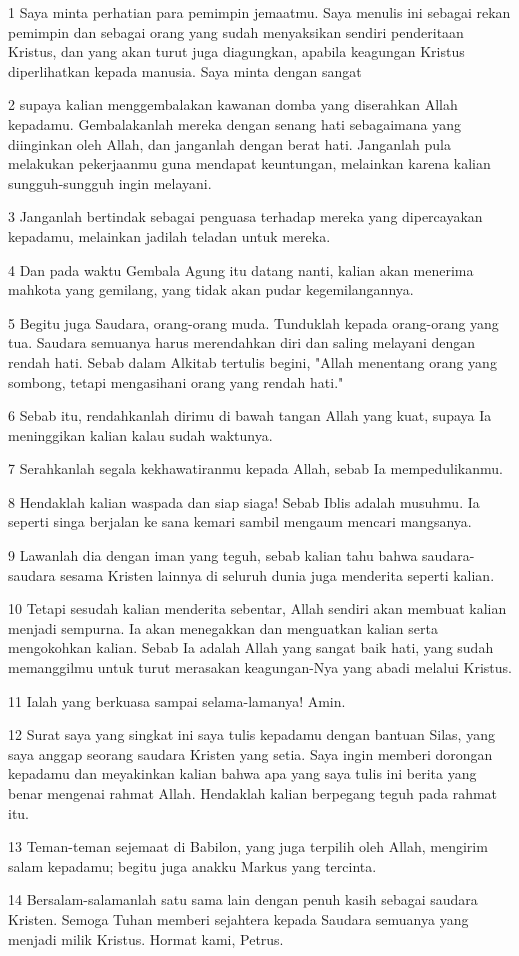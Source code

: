 \par 1 Saya minta perhatian para pemimpin jemaatmu. Saya menulis ini sebagai rekan pemimpin dan sebagai orang yang sudah menyaksikan sendiri penderitaan Kristus, dan yang akan turut juga diagungkan, apabila keagungan Kristus diperlihatkan kepada manusia. Saya minta dengan sangat
\par 2 supaya kalian menggembalakan kawanan domba yang diserahkan Allah kepadamu. Gembalakanlah mereka dengan senang hati sebagaimana yang diinginkan oleh Allah, dan janganlah dengan berat hati. Janganlah pula melakukan pekerjaanmu guna mendapat keuntungan, melainkan karena kalian sungguh-sungguh ingin melayani.
\par 3 Janganlah bertindak sebagai penguasa terhadap mereka yang dipercayakan kepadamu, melainkan jadilah teladan untuk mereka.
\par 4 Dan pada waktu Gembala Agung itu datang nanti, kalian akan menerima mahkota yang gemilang, yang tidak akan pudar kegemilangannya.
\par 5 Begitu juga Saudara, orang-orang muda. Tunduklah kepada orang-orang yang tua. Saudara semuanya harus merendahkan diri dan saling melayani dengan rendah hati. Sebab dalam Alkitab tertulis begini, "Allah menentang orang yang sombong, tetapi mengasihani orang yang rendah hati."
\par 6 Sebab itu, rendahkanlah dirimu di bawah tangan Allah yang kuat, supaya Ia meninggikan kalian kalau sudah waktunya.
\par 7 Serahkanlah segala kekhawatiranmu kepada Allah, sebab Ia mempedulikanmu.
\par 8 Hendaklah kalian waspada dan siap siaga! Sebab Iblis adalah musuhmu. Ia seperti singa berjalan ke sana kemari sambil mengaum mencari mangsanya.
\par 9 Lawanlah dia dengan iman yang teguh, sebab kalian tahu bahwa saudara-saudara sesama Kristen lainnya di seluruh dunia juga menderita seperti kalian.
\par 10 Tetapi sesudah kalian menderita sebentar, Allah sendiri akan membuat kalian menjadi sempurna. Ia akan menegakkan dan menguatkan kalian serta mengokohkan kalian. Sebab Ia adalah Allah yang sangat baik hati, yang sudah memanggilmu untuk turut merasakan keagungan-Nya yang abadi melalui Kristus.
\par 11 Ialah yang berkuasa sampai selama-lamanya! Amin.
\par 12 Surat saya yang singkat ini saya tulis kepadamu dengan bantuan Silas, yang saya anggap seorang saudara Kristen yang setia. Saya ingin memberi dorongan kepadamu dan meyakinkan kalian bahwa apa yang saya tulis ini berita yang benar mengenai rahmat Allah. Hendaklah kalian berpegang teguh pada rahmat itu.
\par 13 Teman-teman sejemaat di Babilon, yang juga terpilih oleh Allah, mengirim salam kepadamu; begitu juga anakku Markus yang tercinta.
\par 14 Bersalam-salamanlah satu sama lain dengan penuh kasih sebagai saudara Kristen. Semoga Tuhan memberi sejahtera kepada Saudara semuanya yang menjadi milik Kristus. Hormat kami, Petrus.


